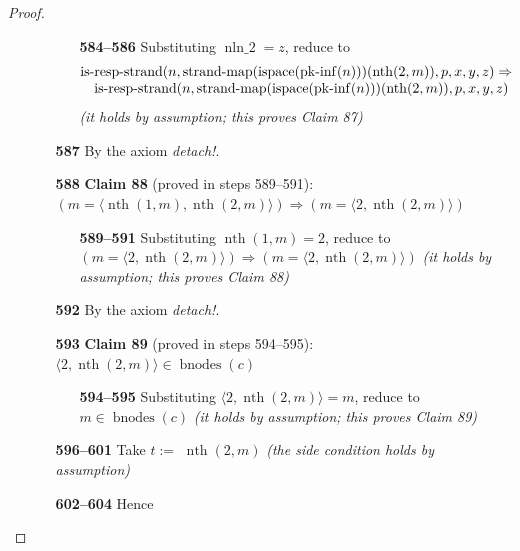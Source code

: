 \documentclass[11pt]{article}
\theoremstyle{plain}
\begin{document}
\begin{proof}
\begin{itemize}[leftmargin=2.8em, itemsep=4pt, parsep=1pt]
\begin{itemize}[leftmargin=2.8em, itemsep=4pt, parsep=1pt]
  \begin{itemize}[leftmargin=2.8em, itemsep=4pt, parsep=1pt]
  \item[\textbf{584--586}] Substituting $\operatorname{nln\_2} = z$, reduce to
\begin{equation*}
\begin{array}{@{}l@{}} \operatorname{is\text{-}resp\text{-}strand}(n, \operatorname{strand\text{-}map}(\operatorname{ispace}(\operatorname{pk\text{-}inf}(n)))(\operatorname{nth}(2, m)), p, x, y, z) \Rightarrow  \\ \quad \operatorname{is\text{-}resp\text{-}strand}(n, \operatorname{strand\text{-}map}(\operatorname{ispace}(\operatorname{pk\text{-}inf}(n)))(\operatorname{nth}(2, m)), p, x, y, z) \end{array}
\end{equation*}
  \emph{(it holds by assumption; this proves Claim 87)}
  \end{itemize}
  \item[\textbf{587}] By the axiom \emph{detach!}.
  \item[\textbf{588}] \textbf{Claim 88} (proved in steps 589--591): $(m = \langle \operatorname{nth}(1, m), \operatorname{nth}(2, m) \rangle) \Rightarrow (m = \langle 2, \operatorname{nth}(2, m) \rangle)$
  \begin{itemize}[leftmargin=2.8em, itemsep=4pt, parsep=1pt]
  \item[\textbf{589--591}] Substituting $\operatorname{nth}(1, m) = 2$, reduce to $(m = \langle 2, \operatorname{nth}(2, m) \rangle) \Rightarrow (m = \langle 2, \operatorname{nth}(2, m) \rangle)$  \emph{(it holds by assumption; this proves Claim 88)}
  \end{itemize}
  \item[\textbf{592}] By the axiom \emph{detach!}.
  \item[\textbf{593}] \textbf{Claim 89} (proved in steps 594--595): $\langle 2, \operatorname{nth}(2, m) \rangle \in \operatorname{bnodes}(c)$
  \begin{itemize}[leftmargin=2.8em, itemsep=4pt, parsep=1pt]
  \item[\textbf{594--595}] Substituting $\langle 2, \operatorname{nth}(2, m) \rangle = m$, reduce to $m \in \operatorname{bnodes}(c)$  \emph{(it holds by assumption; this proves Claim 89)}
  \end{itemize}
  \item[\textbf{596--601}] Take $t :=$ $\operatorname{nth}(2, m)$  \emph{(the side condition holds by assumption)}
  \item[\textbf{602--604}] Hence 

\end{itemize}
\end{itemize}
\end{proof}
\end{document}
